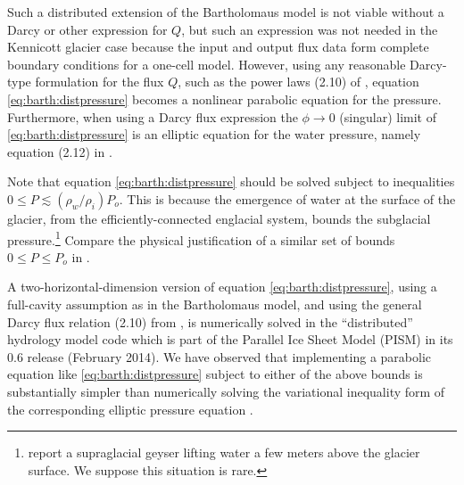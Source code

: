 \documentclass[review,letterpaper]{igs}
\begin{document}
Such a distributed extension of the Bartholomaus model is not viable without a Darcy or other expression for $Q$, but such an expression was not needed in the Kennicott glacier case because the input and output flux data form complete boundary conditions for a one-cell model.  However, using any reasonable Darcy-type formulation for the flux $Q$, such as the power laws (2.10) of \cite{Schoofetal2012}, equation \eqref{eq:barth:distpressure} becomes a nonlinear parabolic equation for the pressure.  Furthermore, when using a Darcy flux expression the $\phi\to 0$ (singular) limit of \eqref{eq:barth:distpressure} is an elliptic equation for the water pressure, namely equation (2.12) in \cite{Schoofetal2012}.

Note that equation \eqref{eq:barth:distpressure} should be solved subject to inequalities $0 \le P \lesssim (\rho_w/\rho_i) P_o$.  This is because the emergence of water at the surface of the glacier, from the efficiently-connected englacial system, bounds the subglacial pressure.\footnote{\cite{Bartholomausetal2011} report a supraglacial geyser lifting water a few meters above the glacier surface.  We suppose this situation is rare.}  Compare the physical justification of a similar set of bounds $0 \le P \le P_o$ in \cite{Schoofetal2012}.

A two-horizontal-dimension version of equation \eqref{eq:barth:distpressure}, using a full-cavity assumption as in the Bartholomaus model, and using the general Darcy flux relation (2.10) from \cite{Schoofetal2012}, is numerically solved in the ``distributed'' hydrology model code which is part of the Parallel Ice Sheet Model (PISM) in its 0.6 release (February 2014).  We have observed that implementing a parabolic equation like \eqref{eq:barth:distpressure} subject to either of the above bounds is substantially simpler than numerically solving the variational inequality form of the corresponding elliptic pressure equation \citep{BuelervanPeltDRAFT,vanPeltthesis}. 
\end{document}
